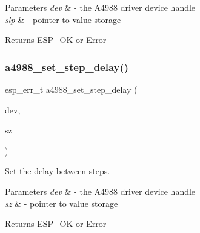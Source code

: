 \begin{DoxyParams}{Parameters}
{\em dev} & -\/ the A4988 driver device handle \\
\hline
{\em slp} & -\/ pointer to value storage \\
\hline
\end{DoxyParams}
\begin{DoxyReturn}{Returns}
E\+S\+P\+\_\+\+OK or Error 
\end{DoxyReturn}
\mbox{\label{group__A4988__Driver__functions_gade65c56d4fb7d4058d7ebae0a95567c9}} 
\subsubsection{\texorpdfstring{a4988\+\_\+set\+\_\+step\+\_\+delay()}{a4988\_set\_step\_delay()}}
{\footnotesize\ttfamily esp\+\_\+err\+\_\+t a4988\+\_\+set\+\_\+step\+\_\+delay (\begin{DoxyParamCaption}\item[{\hyperlink{group__A4988__definitions_ga16590a9dd79ad8fcf4c317be2659b6c5}{A4988\+\_\+\+D\+EV}}]{dev,  }\item[{\hyperlink{vl53l0x__types_8h_a273cf69d639a59973b6019625df33e30}{uint16\+\_\+t} $\ast$}]{sz }\end{DoxyParamCaption})}



Set the delay between steps. 


\begin{DoxyParams}{Parameters}
{\em dev} & -\/ the A4988 driver device handle \\
\hline
{\em sz} & -\/ pointer to value storage \\
\hline
\end{DoxyParams}
\begin{DoxyReturn}{Returns}
E\+S\+P\+\_\+\+OK or Error 
\end{DoxyReturn}
\mbox{\label{group__A4988__Driver__functions_gaf2408ca27eb89e542e82a3c7874aa6b3}} 

